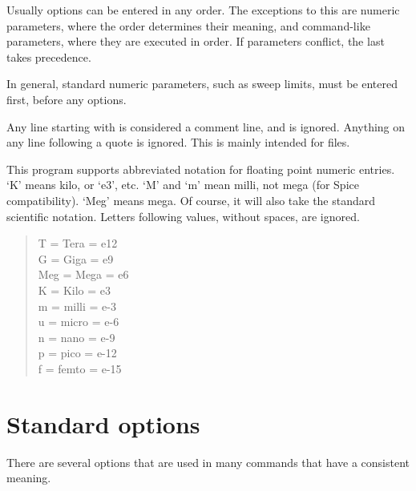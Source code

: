 Usually options can be entered in any order.  The exceptions to this are
numeric parameters, where the order determines their meaning, and
command-like parameters, where they are executed in order.  If parameters
conflict, the last takes precedence.

In general, standard numeric parameters, such as sweep limits, must be
entered first, before any options.

Any line starting with {\tt *} is considered a comment line, and is
ignored.  Anything on any line following a quote is ignored.  This is mainly
intended for files.

This program supports abbreviated notation for floating point numeric
entries.  `K' means kilo, or `e3', etc.  `M' and `m' mean milli, not mega
(for Spice compatibility).  `Meg' means mega.  Of course, it will also take
the standard scientific notation.  Letters following values, without spaces,
are ignored.

\begin{verse}
T = Tera = e12\\
G = Giga = e9\\
Meg = Mega = e6\\
K = Kilo = e3\\
m = milli = e-3\\
u = micro = e-6\\
n = nano = e-9\\
p = pico = e-12\\
f = femto = e-15
\end{verse}
\section{Standard options}

There are several options that are used in many commands that have a
consistent meaning.

